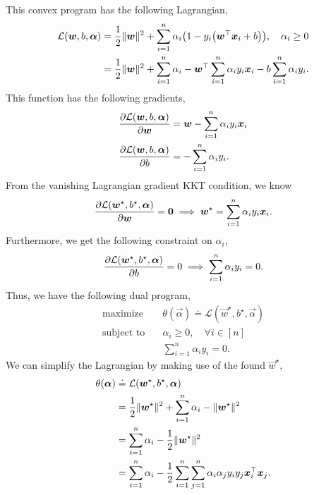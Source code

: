 This convex program has the following Lagrangian,
\begin{align*}
    \mathcal{L}(\vec{w}, b, \vec{\alpha}) & = \frac{1}{2} \| \vec{w} \|^2 + \sum_{i=1}^{n} \alpha_i \lft( 1 - y_i \lft( \transpose{\vec{w}} \vec{x}_i + b \rgt) \rgt), \quad \alpha_i \geq 0     \\
                                          & = \frac{1}{2} \| \vec{w} \|^2 + \sum_{i=1}^{n} \alpha_i - \transpose{\vec{w}} \sum_{i=1}^{n} \alpha_i y_i \vec{x}_i - b \sum_{i=1}^{n} \alpha_i y_i.
\end{align*}
This function has the following gradients,
\begin{align*}
    \pdv{\mathcal{L}(\bm{w}, b, \bm{\alpha})}{\bm{w}} & = \bm{w} - \sum_{i=1}^{n} \alpha_i y_i \bm{x}_i \\
    \pdv{\mathcal{L}(\bm{w}, b, \bm{\alpha})}{b}       & = - \sum_{i=1}^{n} \alpha_i y_i.
\end{align*}
From the vanishing Lagrangian gradient KKT condition, we know \[
    \pdv{\mathcal{L}(\bm{w}^\star, b^\star, \bm{\alpha})}{\bm{w}} = \bm{0} \implies \bm{w}^\star = \sum_{i=1}^{n} \alpha_i y_i \bm{x}_i.
\]
Furthermore, we get the following constraint on $\alpha_i$, \[
    \pdv{\mathcal{L}(\bm{w}^\star, b^\star, \bm{\alpha})}{b} = 0 \implies \sum_{i=1}^{n} \alpha_i y_i = 0.
\]
Thus, we have the following dual program,
\begin{align*}
    \text{maximize}   & \quad \theta(\vec{\alpha}) \doteq \mathcal{L}(\vec{w}^\star, b^\star, \vec{\alpha}) \\
    \text{subject to} & \quad \alpha_i \geq 0, \quad \forall i \in [n]                                      \\
                      & \quad \sum_{i=1}^{n} \alpha_i y_i = 0.
\end{align*}
We can simplify the Lagrangian by making use of the found $\vec{w}^\star$,
\begin{align*}
    \theta(\bm{\alpha}) & \doteq \mathcal{L}(\bm{w}^\star, b^\star, \bm{\alpha})                                                                         \\
                         & = \frac{1}{2} \| \bm{w}^\star \|^2 + \sum_{i=1}^{n} \alpha_i - \| \bm{w}^\star \|^2                                            \\
                         & = \sum_{i=1}^{n} \alpha_i - \frac{1}{2} \| \bm{w}^\star \|^2                                                                    \\
                         & = \sum_{i=1}^{n} \alpha_i - \frac{1}{2} \sum_{i=1}^{n} \sum_{j=1}^{n} \alpha_i \alpha_j y_i y_j \bm{x}_i^\top \bm{x}_j.
\end{align*}
